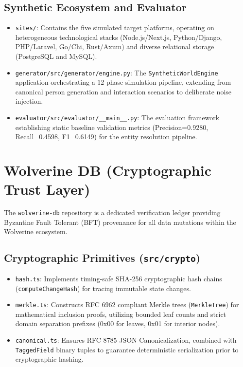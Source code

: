 \subsection{Synthetic Ecosystem and Evaluator}
\begin{itemize}
    \item \texttt{sites/}: Contains the five simulated target platforms, operating on heterogeneous technological stacks (Node.js/Next.js, Python/Django, PHP/Laravel, Go/Chi, Rust/Axum) and diverse relational storage (PostgreSQL and MySQL).
    \item \texttt{generator/src/generator/engine.py}: The \texttt{SyntheticWorldEngine} application orchestrating a 12-phase simulation pipeline, extending from canonical person generation and interaction scenarios to deliberate noise injection.
    \item \texttt{evaluator/src/evaluator/\_\_main\_\_.py}: The evaluation framework establishing static baseline validation metrics (Precision=0.9280, Recall=0.4598, F1=0.6149) for the entity resolution pipeline.
\end{itemize}

\section{Wolverine DB (Cryptographic Trust Layer)}
\label{app:project_inventory:wolverine_db}

The \texttt{wolverine-db} repository is a dedicated verification ledger providing Byzantine Fault Tolerant (BFT) provenance for all data mutations within the Wolverine ecosystem.

\subsection{Cryptographic Primitives (\texttt{src/crypto})}
\begin{itemize}
    \item \texttt{hash.ts}: Implements timing-safe SHA-256 cryptographic hash chains (\texttt{computeChangeHash}) for tracing immutable state changes.
    \item \texttt{merkle.ts}: Constructs RFC 6962 compliant Merkle trees (\texttt{MerkleTree}) for mathematical inclusion proofs, utilizing bounded leaf counts and strict domain separation prefixes (0x00 for leaves, 0x01 for interior nodes).
    \item \texttt{canonical.ts}: Ensures RFC 8785 JSON Canonicalization, combined with \texttt{TaggedField} binary tuples to guarantee deterministic serialization prior to cryptographic hashing.
\end{itemize}


